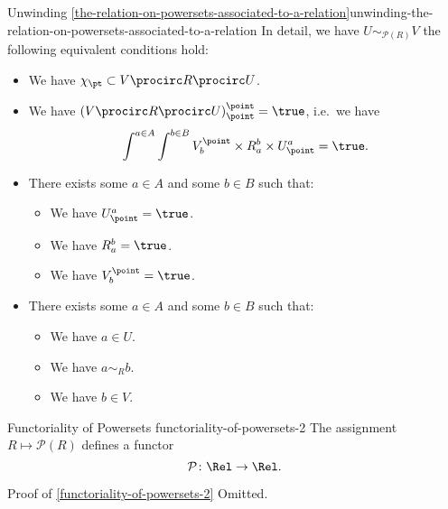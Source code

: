 \begin{remark}{Unwinding \cref{the-relation-on-powersets-associated-to-a-relation}}{unwinding-the-relation-on-powersets-associated-to-a-relation}%
    In detail, we have $U\sim_{\mathcal{P}(R)}V$ \textiff the following equivalent conditions hold:
    \begin{itemize}
        \item We have $\chi_{\pt}\subset V\procirc R\procirc U$.
        \item We have $(V\procirc R\procirc U)^{\point}_{\point}=\true$, i.e.\ we have
            \[
                \int^{a\in A}\int^{b\in B}V^{\point}_{b}\times R^{b}_{a}\times U^{a}_{\point}%
                =%
                \true.%
            \]%
        \item There exists some $a\in A$ and some $b\in B$ such that:
            \begin{itemize}
                \item We have $U^{a}_{\point}=\true$.
                \item We have $R^{b}_{a}=\true$.
                \item We have $V^{\point}_{b}=\true$.
            \end{itemize}
        \item There exists some $a\in A$ and some $b\in B$ such that:
            \begin{itemize}
                \item We have $a\in U$.
                \item We have $a\sim_{R}b$.
                \item We have $b\in V$.
            \end{itemize}
    \end{itemize}
\end{remark}
\begin{proposition}{Functoriality of Powersets \rmII}{functoriality-of-powersets-2}%
    The assignment $R\mapsto\mathcal{P}(R)$ defines a functor
    \[
        \mathcal{P}%
        \colon%
        \Rel%
        \to%
        \Rel.
    \]%
\end{proposition}
\begin{Proof}{Proof of \cref{functoriality-of-powersets-2}}%
    Omitted.
\end{Proof}
\begin{appendices}

\end{appendices}

